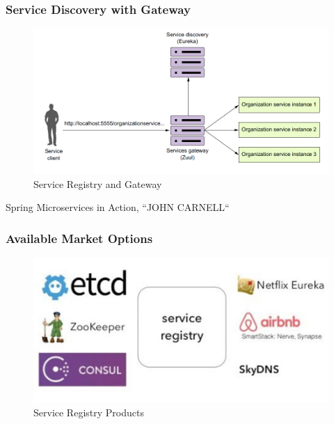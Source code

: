 \documentclass{beamer}
\begin{document}
		\begin{frame}
		\frametitle{Service Discovery with Gateway}
			\begin{figure}[h]
				\centering
				\includegraphics[width=.8\linewidth]{img/zull-and-sd.png}
				\caption{Service Registry and Gateway}
			\end{figure}
		\vspace{10mm}
		\tiny{Spring Microservices in Action, ``JOHN CARNELL``}	
		\end{frame}
		
		\begin{frame}
			\frametitle{Available Market Options}
				\begin{figure}[h]
						\centering
						\includegraphics[width=.8\linewidth]{img/SR.png}
						\caption{Service Registry Products}
				\end{figure}
		\end{frame}
	
\end{document}
